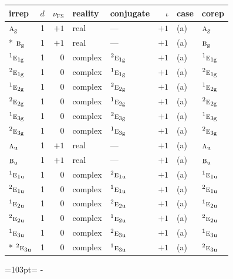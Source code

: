 \documentclass[10pt,a4paper]{article}
\newcommand{\needspace}[1]{\par\penalty-100\begingroup\dimen0=#1\relax\dimen2=\pagegoal
  \advance\dimen2-\pagetotal\ifdim\dimen0>\dimen2\relax\ifdim\dimen2>0pt\vfil\break\fi\fi
  \endgroup}
\numberwithin{equation}{section}
\newcommand{\irr}[1]{\text{\normalfont\scshape #1}}
\newcommand{\conjpair}[1]{{}^{#1}}
\newcommand{\ptag}[1]{\mathrm{#1}}
\newcommand{\fsind}{\nu_{\mathrm{FS}}}
\begin{document}
{\small\renewcommand{\arraystretch}{1.25}\setlength{\tabcolsep}{4pt}\begin{longtable}{@{}lrrllrll@{}}\toprule
irrep & $d$ & $\fsind$ & reality & conjugate & $\iota$ & case & corep\\\midrule\endhead
\bottomrule\endfoot\endlastfoot
$\irr{a}_{\ptag{g}}$ & 1 & $+1$ & real & --- & $+1$ & (a) & $\irr{a}_{\ptag{g}}$\\*
$\irr{b}_{\ptag{g}}$ & 1 & $+1$ & real & --- & $+1$ & (a) & $\irr{b}_{\ptag{g}}$\\
$\conjpair{1}\irr{e}_{1\ptag{g}}$ & 1 & $0$ & complex & $\conjpair{2}\irr{e}_{1\ptag{g}}$ & $+1$ & (a) & $\conjpair{1}\irr{e}_{1\ptag{g}}$\\
$\conjpair{2}\irr{e}_{1\ptag{g}}$ & 1 & $0$ & complex & $\conjpair{1}\irr{e}_{1\ptag{g}}$ & $+1$ & (a) & $\conjpair{2}\irr{e}_{1\ptag{g}}$\\
$\conjpair{1}\irr{e}_{2\ptag{g}}$ & 1 & $0$ & complex & $\conjpair{2}\irr{e}_{2\ptag{g}}$ & $+1$ & (a) & $\conjpair{1}\irr{e}_{2\ptag{g}}$\\
$\conjpair{2}\irr{e}_{2\ptag{g}}$ & 1 & $0$ & complex & $\conjpair{1}\irr{e}_{2\ptag{g}}$ & $+1$ & (a) & $\conjpair{2}\irr{e}_{2\ptag{g}}$\\
$\conjpair{1}\irr{e}_{3\ptag{g}}$ & 1 & $0$ & complex & $\conjpair{2}\irr{e}_{3\ptag{g}}$ & $+1$ & (a) & $\conjpair{1}\irr{e}_{3\ptag{g}}$\\
$\conjpair{2}\irr{e}_{3\ptag{g}}$ & 1 & $0$ & complex & $\conjpair{1}\irr{e}_{3\ptag{g}}$ & $+1$ & (a) & $\conjpair{2}\irr{e}_{3\ptag{g}}$\\
$\irr{a}_{\ptag{u}}$ & 1 & $+1$ & real & --- & $+1$ & (a) & $\irr{a}_{\ptag{u}}$\\
$\irr{b}_{\ptag{u}}$ & 1 & $+1$ & real & --- & $+1$ & (a) & $\irr{b}_{\ptag{u}}$\\
$\conjpair{1}\irr{e}_{1\ptag{u}}$ & 1 & $0$ & complex & $\conjpair{2}\irr{e}_{1\ptag{u}}$ & $+1$ & (a) & $\conjpair{1}\irr{e}_{1\ptag{u}}$\\
$\conjpair{2}\irr{e}_{1\ptag{u}}$ & 1 & $0$ & complex & $\conjpair{1}\irr{e}_{1\ptag{u}}$ & $+1$ & (a) & $\conjpair{2}\irr{e}_{1\ptag{u}}$\\
$\conjpair{1}\irr{e}_{2\ptag{u}}$ & 1 & $0$ & complex & $\conjpair{2}\irr{e}_{2\ptag{u}}$ & $+1$ & (a) & $\conjpair{1}\irr{e}_{2\ptag{u}}$\\
$\conjpair{2}\irr{e}_{2\ptag{u}}$ & 1 & $0$ & complex & $\conjpair{1}\irr{e}_{2\ptag{u}}$ & $+1$ & (a) & $\conjpair{2}\irr{e}_{2\ptag{u}}$\\
$\conjpair{1}\irr{e}_{3\ptag{u}}$ & 1 & $0$ & complex & $\conjpair{2}\irr{e}_{3\ptag{u}}$ & $+1$ & (a) & $\conjpair{1}\irr{e}_{3\ptag{u}}$\\*
$\conjpair{2}\irr{e}_{3\ptag{u}}$ & 1 & $0$ & complex & $\conjpair{1}\irr{e}_{3\ptag{u}}$ & $+1$ & (a) & $\conjpair{2}\irr{e}_{3\ptag{u}}$\\
\bottomrule\end{longtable}}
\needspace{103pt}
\end{document}
